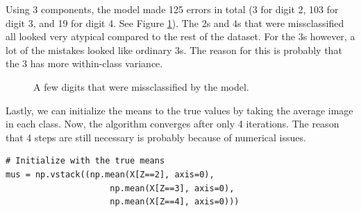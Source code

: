\documentclass[a4paper]{article}
\begin{document}
\begin{enumerate}
Using 3 components, the model made 125 errors in total (3 for digit 2, 103 for digit 3, and 19 for digit 4. See Figure \ref{fig:missers}). The 2s and 4s that were missclassified all looked very atypical compared to the rest of the dataset. For the 3s however, a lot of the mistakes looked like ordinary 3s. The reason for this is probably that the 3 has more within-class variance.

\begin{figure}
\centering
{}
\caption{A few digits that were missclassified by the model.}
\label{fig:missers}
\end{figure}

Lastly, we can initialize the means to the true values by taking the average image in each class. Now, the algorithm converges after only 4 iterations. The reason that 4 steps are still necessary is probably because of numerical issues.
\begin{lstlisting}
# Initialize with the true means
mus = np.vstack((np.mean(X[Z==2], axis=0),
                     np.mean(X[Z==3], axis=0),
                     np.mean(X[Z==4], axis=0)))
\end{lstlisting}


\end{enumerate}
\end{document}
